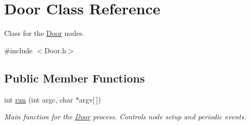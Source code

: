 \hypertarget{classDoor}{\section{Door Class Reference}
\label{classDoor}
}


Class for the \hyperlink{classDoor}{Door} nodes.  




{\ttfamily \#include $<$Door.\-h$>$}

\subsection*{Public Member Functions}
\begin{DoxyCompactItemize}
\item 
\hypertarget{classDoor_a6b8d9bba2d7cbaa3262887a209c3ffca}{int \hyperlink{classDoor_a6b8d9bba2d7cbaa3262887a209c3ffca}{run} (int argc, char $\ast$argv\mbox{[}$\,$\mbox{]})}\label{classDoor_a6b8d9bba2d7cbaa3262887a209c3ffca}

\begin{DoxyCompactList}\small\item\em Main function for the \hyperlink{classDoor}{Door} process. Controls node setup and periodic events. \end{DoxyCompactList}\end{DoxyCompactItemize}
